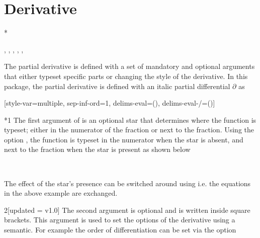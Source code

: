 	
	
	\clearpage
	\section{Derivative}
	
	\begin{function}*{\pdv}
		\begin{syntax}
			\sarg, , , \targ{/}, , 
		\end{syntax}
		The partial derivative  is defined with a set of mandatory and optional arguments that either typeset specific parts or changing the style of the derivative. In this package, the partial derivative is defined with an italic partial differential $\partial$ as
		
		\begin{definition}
			\DeclareDerivative{\pdv}{\partial}[style-var=multiple, sep-inf-ord=1,
			delims-eval=(), delims-eval-/=()]
		\end{definition}
		
		\begin{argument}*{1}
			The first argument of  is an optional star that determines where the function is typeset; either in the numerator of the fraction or next to the fraction. Using the option , the function is typeset in the numerator when the star is absent, and next to the fraction when the star is present as shown below
			
			\begin{example}
				 \\
			\end{example}
			
			\noindent The effect of the star's presence can be switched around using  i.e. the equations in the above example are exchanged.
		\end{argument}
		
		\begin{argument}{2}[updated = v1.0]
			The second argument is optional and is written inside square brackets. This argument is used to set the options of the derivative using a  semantic. For example the order of differentiation can be set via the \key[cat=misc]{order} option
			
			\begin{example}
				\pdv[order={2,3}]{f}{x,y} \\
				\pdv[order={\beta,a,n+2a}]{f}{x,y,z} \\
				\pdv[order={2,n^2,n^2-1}]{f}{x,y,z} \\
				\pdv[order={2,n^2}]{f}{x,y,z}
			\end{example}
			

\end{argument}
\end{function}
